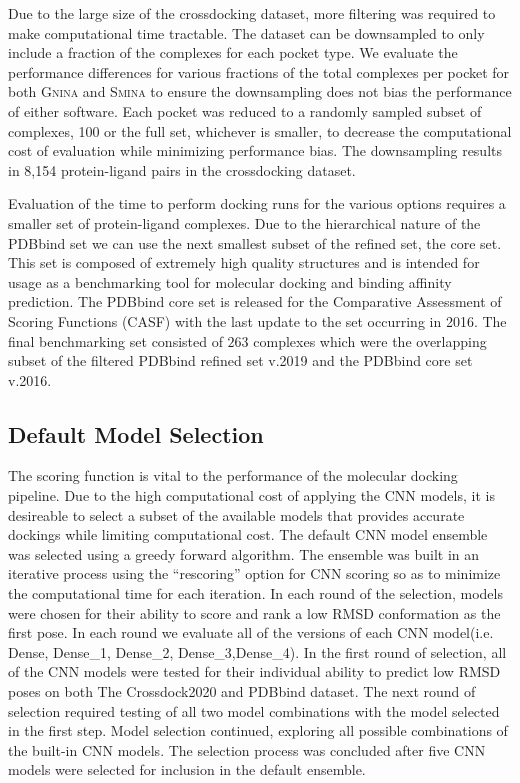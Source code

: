 \documentclass[journal=jcisd8,manuscript=article]{achemso}
\begin{document}
Due to the large size of the crossdocking dataset, more filtering was required to make computational time tractable. The dataset can be downsampled to only include a fraction of the complexes for each pocket type. We evaluate the performance differences for various fractions of the total complexes per pocket for both \textsc{Gnina} and \textsc{Smina} to ensure the downsampling does not bias the performance of either software. Each pocket was reduced to a randomly sampled subset of complexes, 100 or the full set, whichever is smaller, to decrease the computational cost of evaluation while minimizing performance bias. The downsampling results in 8,154 protein-ligand pairs in the crossdocking dataset. 

Evaluation of the time to perform docking runs for the various options requires a smaller set of protein-ligand complexes. Due to the hierarchical nature of the PDBbind set we can use the next smallest subset of the refined set, the core set. This set is composed of extremely high quality structures and is intended for usage as a benchmarking tool for molecular docking and binding affinity prediction. The PDBbind core set is released for the Comparative Assessment of Scoring Functions (CASF) with the last update to the set occurring in 2016\cite{su2018comparative}. The final benchmarking set consisted of $263$ complexes which were the overlapping subset of the filtered PDBbind refined set v.2019 and the PDBbind core set v.2016.

\subsection{Default Model Selection}
The scoring function is vital to the performance of the molecular docking pipeline.  Due to the high computational cost of applying the CNN models, it is desireable to select a subset of the available models that provides accurate dockings while limiting computational cost. The default CNN model ensemble was selected using a greedy forward algorithm. The ensemble was built in an iterative process using the ``rescoring'' option for CNN scoring so as to minimize the computational time for each iteration. In each round of the selection, models were chosen for their ability to score and rank a low RMSD conformation as the first pose. In each round we evaluate all of the versions of each CNN model(i.e. Dense, Dense\_1, Dense\_2, Dense\_3,Dense\_4). In the first round of selection, all of the CNN models were tested for their individual ability to predict low RMSD poses on both The Crossdock2020 and PDBbind dataset. The next round of selection required testing of all two model combinations with the model selected in the first step. Model selection continued, exploring all possible combinations of the built-in CNN models. The selection process was concluded after five CNN models were selected for inclusion in the default ensemble.
\end{document}
